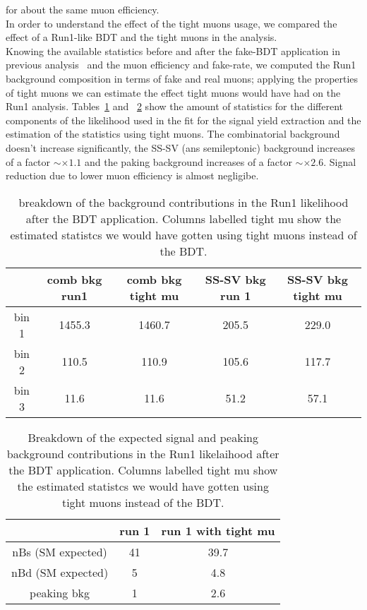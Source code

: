 for about the same muon efficiency.\\
In order to understand the effect of the tight muons usage, we compared the effect of a Run1-like BDT and the tight muons in the analysis.\\
Knowing the available statistics before and after the fake-BDT application in previous 
analysis~\cite{Alpigiani:1756291} and the muon efficiency and fake-rate, we computed the 
Run1 background composition in terms of fake and real muons; applying the properties of tight muons we can estimate the effect 
tight muons would have had on the Run1 analysis.
Tables~\ref{table:bkgInRun1_BDTandTightMu} and ~\ref{table:sigInRun1_BDTandTightMu} show the amount 
of statistics for the different components of the likelihood used in the fit for the signal yield extraction 
and the estimation of the statistics using tight muons. The combinatorial background doesn't increase significantly, 
the SS-SV (ans semileptonic) background increases of a factor $\sim \times 1.1$ and the paking background increases 
of a factor $\sim \times 2.6$. Signal reduction due to lower muon efficiency is almost negligibe.\\
\begin{table}[h]
  \begin{center}
    \begin{tabular}{| c | c | c | c | c |}
      \hline
       & comb bkg run1 & comb bkg tight mu & SS-SV bkg run 1 & SS-SV bkg tight mu\\  \hline
      bin 1 & 1455.3 & 1460.7 & 205.5 & 229.0\\  \hline
      bin 2 & 110.5 & 110.9 & 105.6 & 117.7\\  \hline
      bin 3 & 11.6 & 11.6 & 51.2 & 57.1\\  \hline
   \end{tabular}
    \caption{breakdown of the background contributions in the Run1 likelihood after the BDT application. 
    Columns labelled tight mu show the estimated statistcs we would have gotten using tight muons instead of the BDT.}
    \label{table:bkgInRun1_BDTandTightMu}
  \end{center}
\end{table}
\begin{table}[h]
  \begin{center}
    \begin{tabular}{| c | c | c |}
      \hline
       & run 1 & run 1 with tight mu  \\ \hline
      nBs (SM expected) & 41 & 39.7 \\ \hline
      nBd (SM expected) & 5 & 4.8 \\ \hline
      peaking bkg & 1 & 2.6 \\ \hline
    \end{tabular}
    \caption{Breakdown of the expected signal and peaking background contributions in the Run1 likelaihood after the BDT application. 
    Columns labelled tight mu show the estimated statistcs we would have gotten using tight muons instead of the BDT.}
    \label{table:sigInRun1_BDTandTightMu}
  \end{center}
\end{table}
